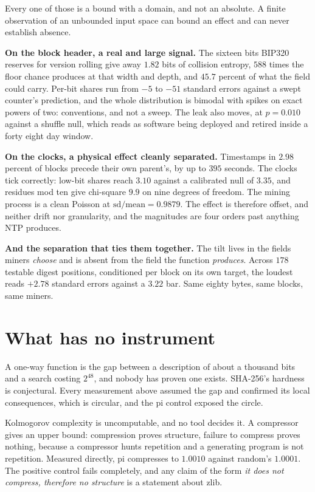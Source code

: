 Every one of those is a bound with a domain, and not an absolute. A finite observation of an unbounded input space can bound an effect and can never establish absence.

\textbf{On the block header, a real and large signal.} The sixteen bits BIP320 reserves for version rolling give away \(1.82\) bits of collision entropy, \(588\) times the floor chance produces at that width and depth, and \(45.7\) percent of what the field could carry. Per-bit shares run from \(-5\) to \(-51\) standard errors against a swept counter's prediction, and the whole distribution is bimodal with spikes on exact powers of two: conventions, and not a sweep. The leak also moves, at \(p = 0.010\) against a shuffle null, which reads as software being deployed and retired inside a forty eight day window.

\textbf{On the clocks, a physical effect cleanly separated.} Timestamps in \(2.98\) percent of blocks precede their own parent's, by up to \(395\) seconds. The clocks tick correctly: low-bit shares reach \(3.10\) against a calibrated null of \(3.35\), and residues mod ten give chi-square \(9.9\) on nine degrees of freedom. The mining process is a clean Poisson at \(\mathrm{sd}/\mathrm{mean} = 0.9879\). The effect is therefore offset, and neither drift nor granularity, and the magnitudes are four orders past anything NTP produces.

\textbf{And the separation that ties them together.} The tilt lives in the fields miners \emph{choose} and is absent from the field the function \emph{produces}. Across \(178\) testable digest positions, conditioned per block on its own target, the loudest reads \(+2.78\) standard errors against a \(3.22\) bar. Same eighty bytes, same blocks, same miners.

\section{What has no instrument}

A one-way function is the gap between a description of about a thousand bits and a search costing \(2^{48}\), and nobody has proven one exists. SHA-256's hardness is conjectural. Every measurement above assumed the gap and confirmed its local consequences, which is circular, and the pi control exposed the circle.

Kolmogorov complexity is uncomputable, and no tool decides it. A compressor gives an upper bound: compression proves structure, failure to compress proves nothing, because a compressor hunts repetition and a generating program is not repetition. Measured directly, pi compresses to \(1.0010\) against random's \(1.0001\). The positive control fails completely, and any claim of the form \emph{it does not compress, therefore no structure} is a statement about zlib.

